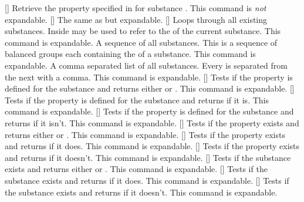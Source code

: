 \documentclass[load-preamble+]{cnltx-doc}
\begin{document}
\begin{commands}
  []
    Retrieve the property specified in  for substance .
    This command is \emph{not} expandable.
  \expandable{}[]
    The same as  but expandable.
  \expandable{}[]
    Loops through all existing substances. Inside   may
    be used to refer to the  of the current substance. This command
    is expandable.
  \expandable{}
    A sequence of all substances. This is a sequence of balanced groups each
    containing the  of a substance. This command is expandable.
  \expandable{}
    A comma separated list of all substances. Every  is separated
    from the next with a comma. This command is expandable.
  \expandable{}[]
    Tests if the property  is defined for the substance 
    and returns either  or . This command is
    expandable.
  \expandable{}[]
    Tests if the property  is defined for the substance 
    and returns  if it is. This command is expandable.
  \expandable{}[]
    Tests if the property  is defined for the substance 
    and returns  if it isn't. This command is expandable.
  \expandable{}[]
    Tests if the property  exists and returns either
     or . This command is expandable.
  \expandable{}[]
    Tests if the property  exists and returns  if
    it does. This command is expandable.
  \expandable{}[]
    Tests if the property  exists and returns  if
    it doesn't. This command is expandable.
  \expandable{}[]
    Tests if the substance  exists and returns either  or . This command is expandable.
  \expandable{}[]
    Tests if the substance  exists and returns  if
    it does. This command is expandable.
  \expandable{}[]
    Tests if the substance  exists and returns  if
    it doesn't. This command is expandable.
\end{commands}
\end{document}
